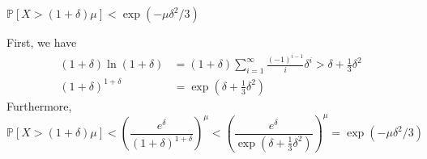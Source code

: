 \documentclass[11pt]{article}
\begin{document}
\begin{qparts}
    
    \item $\mathbb{P}\left[ X>(1+\delta)\mu \right]<\exp(-\mu \delta^{2} / 3)$
    \begin{solution}
        First, we have 
        \begin{align*}
            (1+\delta)\ln(1+\delta)&=(1+\delta)\sum_{i=1}^{\infty}\frac{(-1)^{i-1}}{i}\delta ^{i}>\delta+\frac{1}{3}\delta^{2}\\
            (1+\delta)^{1+\delta}&=\exp(\delta+\frac{1}{3}\delta^{2})
        \end{align*}
        Furthermore, 
        $$
        \mathbb{P}\left[ X>(1+\delta)\mu \right]<\left( \frac{e^{\delta}}{(1+\delta)^{1+\delta}} \right)^{\mu} <
        \left( \frac{e^{\delta}}{\exp(\delta+\frac{1}{3}\delta^{2})} \right)^{\mu} =\exp(-\mu \delta^{2} / 3)
        $$
    \end{solution}
\end{qparts}
\end{document}
